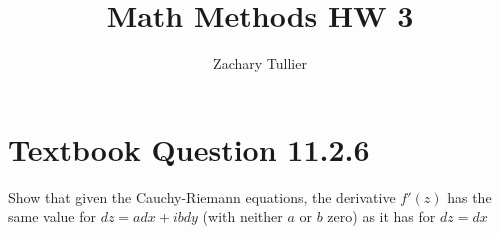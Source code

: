 \documentclass[12pt]{article}
\begin{document}
\singlespacing  %
\title{Math Methods HW 3}

\author[1]{Zachary Tullier}
\date{}

\maketitle




\section*{Textbook Question 11.2.6}
    Show that given the Cauchy-Riemann equations, the derivative $f'(z)$ has the same value for $dz = a dx + i b dy$ (with neither $a$ or $b$ zero) as it has for $dz = dx$
\end{document}
